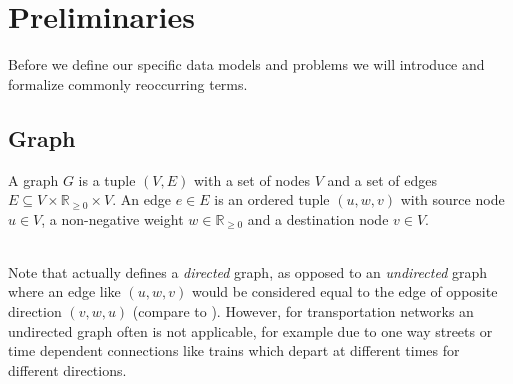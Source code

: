 \chapter{Preliminaries}\label{preliminaries}
	Before we define our specific data models and problems we will introduce and formalize commonly reoccurring terms.

\section{Graph}
	\begin{mydef}\label{graph}
		A \textnormal{graph} $G$ is a tuple $(V, E)$ with a set of nodes $V$ and a set of
		edges $E \subseteq V \times \mathbb{R}_{\ge 0} \times V$.
		An \textnormal{edge} $e \in E$ is an ordered tuple $(u, w, v)$ with source node $u \in V$, a non-negative
		weight $w \in \mathbb{R}_{\ge 0}$ and a destination node $v \in V$.
	\end{mydef}\quad\\
	Note that  actually defines a \textit{directed} graph, as opposed to an \textit{undirected} graph where an
	edge like $(u, w, v)$ would be considered equal to the edge of opposite direction $(v, w, u)$ (compare to ).
	However, for transportation networks an undirected graph often is not applicable, for example due to one way streets or
	time dependent connections like trains which depart at different times for different directions.
	
